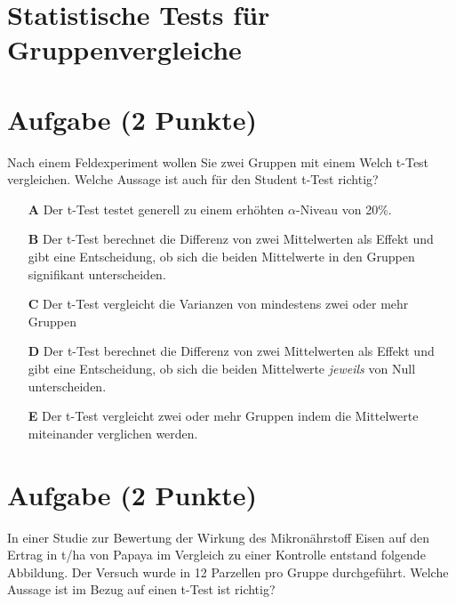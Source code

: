 \documentclass[a4paper, 9pt]{scrartcl}\usepackage[]{graphicx}\usepackage[]{xcolor}
\begin{document}
\section*{Statistische Tests für Gruppenvergleiche} 

\section{Aufgabe \hfill (2 Punkte)}



Nach einem Feldexperiment wollen Sie zwei Gruppen mit einem Welch t-Test vergleichen. Welche Aussage ist auch für den Student t-Test richtig?



\begin{enumerate}
\item [\textbf{A} \msquare] Der t-Test testet generell zu einem erhöhten $\alpha$-Niveau von 20\%.
\item [\textbf{B} \msquare] Der t-Test berechnet die Differenz von zwei Mittelwerten als Effekt und gibt eine Entscheidung, ob sich die beiden Mittelwerte in den Gruppen signifikant unterscheiden.
\item [\textbf{C} \msquare] Der t-Test vergleicht die Varianzen von mindestens zwei oder mehr Gruppen
\item [\textbf{D} \msquare] Der t-Test berechnet die Differenz von zwei Mittelwerten als Effekt und gibt eine Entscheidung, ob sich die beiden Mittelwerte \textit{jeweils} von Null unterscheiden.
\item [\textbf{E} \msquare] Der t-Test vergleicht zwei oder mehr Gruppen indem die Mittelwerte miteinander verglichen werden.
\end{enumerate}

\section{Aufgabe \hfill (2 Punkte)}



In einer Studie zur Bewertung der Wirkung des Mikronährstoff Eisen auf den Ertrag in t/ha  von Papaya im Vergleich zu einer Kontrolle entstand folgende Abbildung. Der Versuch wurde in 12 Parzellen pro Gruppe durchgeführt. Welche Aussage ist im Bezug auf einen t-Test ist richtig?
\end{document}
